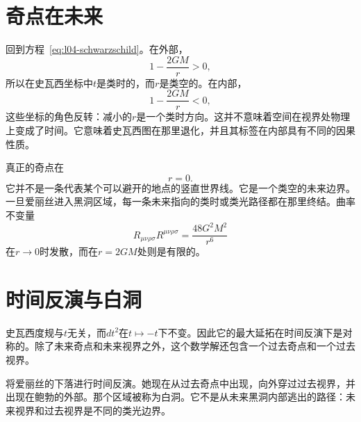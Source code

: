 \section{奇点在未来}

回到方程~\eqref{eq:l04-schwarzschild}。在外部，
\begin{equation}
1-\frac{2GM}{r}>0,
\end{equation}
所以在史瓦西坐标中\(t\)是类时的，而\(r\)是类空的。在内部，
\begin{equation}
1-\frac{2GM}{r}<0,
\end{equation}
这些坐标的角色反转：减小的\(r\)是一个类时方向。这并不意味着空间在视界处物理上变成了时间。它意味着史瓦西图在那里退化，并且其标签在内部具有不同的因果性质。

真正的奇点在
\begin{equation}
r=0.
\end{equation}
它并不是一条代表某个可以避开的地点的竖直世界线。它是一个类空的未来边界。一旦爱丽丝进入黑洞区域，每一条未来指向的类时或类光路径都在那里终结。曲率不变量
\begin{equation}
R_{\mu\nu\rho\sigma}R^{\mu\nu\rho\sigma}
=\frac{48G^2M^2}{r^6}
\label{eq:l04-kretschmann}
\end{equation}
在\(r\to0\)时发散，而在\(r=2GM\)处则是有限的。

\section{时间反演与白洞}

史瓦西度规与\(t\)无关，而\(dt^2\)在\(t\mapsto-t\)下不变。因此它的最大延拓在时间反演下是对称的。除了未来奇点和未来视界之外，这个数学解还包含一个过去奇点和一个过去视界。

将爱丽丝的下落进行时间反演。她现在从过去奇点中出现，向外穿过过去视界，并出现在鲍勃的外部。那个区域被称为白洞。它不是从未来黑洞内部逃出的路径：未来视界和过去视界是不同的类光边界。

\begin{classroomqa}
\end{classroomqa}

\begin{classroomqa}
\end{classroomqa}

